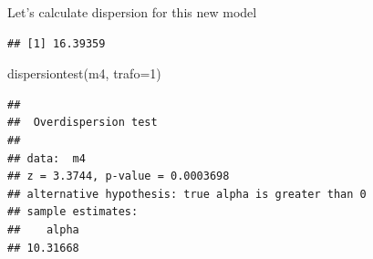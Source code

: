 \documentclass[
  ignorenonframetext,
]{beamer}
\newenvironment{Shaded}{\begin{snugshade}}{\end{snugshade}}
\newcommand{\AttributeTok}[1]{\textcolor[rgb]{0.77,0.63,0.00}{#1}}
\newcommand{\DecValTok}[1]{\textcolor[rgb]{0.00,0.00,0.81}{#1}}
\newcommand{\DocumentationTok}[1]{\textcolor[rgb]{0.56,0.35,0.01}{\textbf{\textit{#1}}}}
\newcommand{\FunctionTok}[1]{\textcolor[rgb]{0.00,0.00,0.00}{#1}}
\newcommand{\NormalTok}[1]{#1}
\newcommand{\OtherTok}[1]{\textcolor[rgb]{0.56,0.35,0.01}{#1}}
\newcommand{\SpecialCharTok}[1]{\textcolor[rgb]{0.00,0.00,0.00}{#1}}
\newcommand{\StringTok}[1]{\textcolor[rgb]{0.31,0.60,0.02}{#1}}
\begin{document}
\begin{frame}[fragile]{}
\protect\hypertarget{section-15}{}
Let's calculate dispersion for this new model

\vspace{12pt}
\tiny

\begin{Shaded}
\end{Shaded}

\begin{verbatim}
## [1] 16.39359
\end{verbatim}

\begin{Shaded}
\begin{Highlighting}[]
\FunctionTok{dispersiontest}\NormalTok{(m4, }\AttributeTok{trafo=}\DecValTok{1}\NormalTok{)}
\end{Highlighting}
\end{Shaded}

\begin{verbatim}
## 
##  Overdispersion test
## 
## data:  m4
## z = 3.3744, p-value = 0.0003698
## alternative hypothesis: true alpha is greater than 0
## sample estimates:
##    alpha 
## 10.31668
\end{verbatim}
\end{frame}
\end{document}
